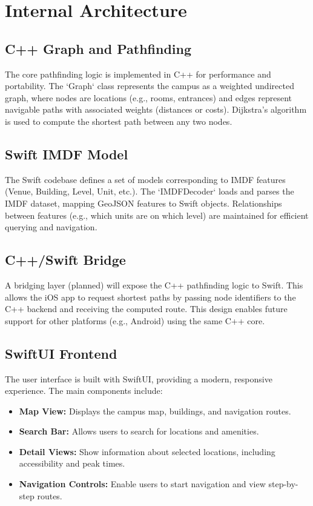 \documentclass{article}
\begin{document}
\section{Internal Architecture}
\subsection{C++ Graph and Pathfinding}
The core pathfinding logic is implemented in C++ for performance and portability. The `Graph` class represents the campus as a weighted undirected graph, where nodes are locations (e.g., rooms, entrances) and edges represent navigable paths with associated weights (distances or costs). Dijkstra's algorithm is used to compute the shortest path between any two nodes.

\subsection{Swift IMDF Model}
The Swift codebase defines a set of models corresponding to IMDF features (Venue, Building, Level, Unit, etc.). The `IMDFDecoder` loads and parses the IMDF dataset, mapping GeoJSON features to Swift objects. Relationships between features (e.g., which units are on which level) are maintained for efficient querying and navigation.

\subsection{C++/Swift Bridge}
A bridging layer (planned) will expose the C++ pathfinding logic to Swift. This allows the iOS app to request shortest paths by passing node identifiers to the C++ backend and receiving the computed route. This design enables future support for other platforms (e.g., Android) using the same C++ core.

\subsection{SwiftUI Frontend}
The user interface is built with SwiftUI, providing a modern, responsive experience. The main components include:
\begin{itemize}
    \item \textbf{Map View:} Displays the campus map, buildings, and navigation routes.
    \item \textbf{Search Bar:} Allows users to search for locations and amenities.
    \item \textbf{Detail Views:} Show information about selected locations, including accessibility and peak times.
    \item \textbf{Navigation Controls:} Enable users to start navigation and view step-by-step routes.
\end{itemize}
\end{document}
